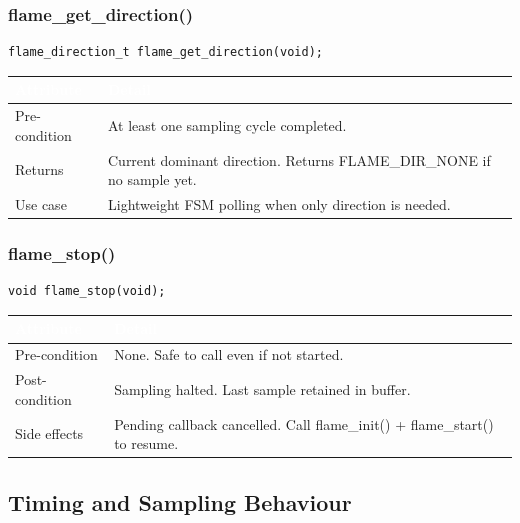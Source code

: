 \documentclass[12pt,a4paper]{article}
\newcommand{\theadtext}[1]{\textcolor{white}{\textbf{#1}}}
\newcommand{\fn}[1]{{\footnotesize\ttfamily #1}}
\begin{document}
\subsubsection{\fn{flame\_get\_direction()}}

\begin{lstlisting}[caption={Signature}]
flame_direction_t flame_get_direction(void);
\end{lstlisting}

\begin{table}[H]\centering\small
\begin{tabularx}{\textwidth}{L{3cm} X}
\toprule
{}\theadtext{Attribute} & \theadtext{Detail} \\
\midrule
{}   Pre-condition  & At least one sampling cycle completed. \\
 Returns        & Current dominant direction. Returns \fn{FLAME\_DIR\_NONE} if no sample yet. \\
   Use case       & Lightweight FSM polling when only direction is needed. \\
\bottomrule
\end{tabularx}
\end{table}

\subsubsection{\fn{flame\_stop()}}

\begin{lstlisting}[caption={Signature}]
void flame_stop(void);
\end{lstlisting}

\begin{table}[H]\centering\small
\begin{tabularx}{\textwidth}{L{3cm} X}
\toprule
{}\theadtext{Attribute} & \theadtext{Detail} \\
\midrule
{}   Pre-condition  & None. Safe to call even if not started. \\
 Post-condition & Sampling halted. Last sample retained in buffer. \\
   Side effects   & Pending callback cancelled. Call \fn{flame\_init()} + \fn{flame\_start()} to resume. \\
\bottomrule
\end{tabularx}
\end{table}

\subsection{Timing and Sampling Behaviour}
\end{document}
